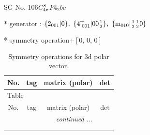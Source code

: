 \documentclass[fleqn,8pt]{jsarticle}
\begin{document}
\setcounter{MaxMatrixCols}{32}

\renewcommand{\tablename}{Table~}
\renewcommand{\figurename}{Figure~}
\begin{center}
\LARGE
SG No. 106\quad$C_{\rm 4v}^{8}$\quad$P4_2bc$\quad[ tetragonal ]
\end{center}

* generator : $\{2{}_{001}|0\},\,\,\{4^{+}_{\,\,001}|0 0 \frac{1}{2}\},\,\,\{{\rm m}_{010}|\frac{1}{2} \frac{1}{2} 0\}$

* symmetry operation\quad$+\left[ 0,\, 0,\, 0 \right]$
\renewcommand{\arraystretch}{1.3}
\begin{longtable}{cccc}
\caption{Symmetry operations for 3d polar vector.}
 \\
 \hline \hline
No. & tag & matrix (polar) & det \\ \hline \endfirsthead

\multicolumn{3}{l}{\tablename\ \thetable{}} \\
 \hline \hline
No. & tag & matrix (polar) & det \\ \hline \endhead

 \hline \hline
\multicolumn{3}{r}{\footnotesize\it continued ...} \\ \endfoot

 \hline \hline
\multicolumn{3}{r}{} \\ \endlastfoot


\end{longtable}
\end{document}
